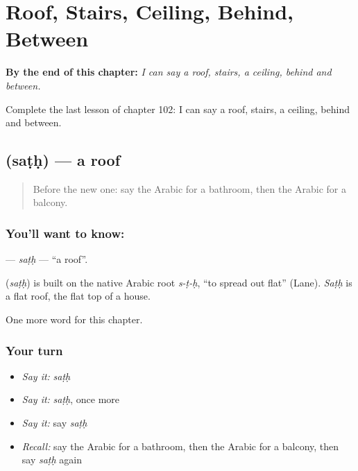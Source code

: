 
\chapter{Roof, Stairs, Ceiling, Behind, Between}
\label{ch:ar-roof-stairs-ceiling-behind-between}

\begin{chapteropening}
\textbf{By the end of this chapter:} \emph{I can say a roof, stairs, a ceiling, behind and between.}

Complete the last lesson of chapter 102: I can say a roof, stairs, a ceiling, behind and between.
\end{chapteropening}

\section[\texorpdfstring{\ar{سطح} (saṭḥ)}{سطح (saṭḥ)}]{ (saṭḥ) — a roof}

\label{lesson:AR-C102-sath}



\begin{quote}
Before the new one: say the Arabic for a bathroom, then the Arabic for a balcony.
\end{quote}

\subsection*{You'll want to know: }
\textbf{} — \emph{saṭḥ} — \textquotedblleft{}a roof\textquotedblright{}.

\begin{cousinweb}
\textbf{} (\emph{saṭḥ}) is built on the native Arabic root \emph{s-ṭ-ḥ}, \textquotedblleft{}to spread out flat\textquotedblright{} (Lane). \emph{Saṭḥ} is a flat roof, the flat top of a house.
\end{cousinweb}

\begin{grammarlens}[title={What you've built}]
One more word for this chapter.
\end{grammarlens}

\subsection*{Your turn}
\begin{itemize}
\raggedright
  \item \emph{Say it:} \emph{saṭḥ}
  \item \emph{Say it:} \emph{saṭḥ}, once more
  \item \emph{Say it:} say \emph{saṭḥ}
  \item \emph{Recall:} say the Arabic for a bathroom, then the Arabic for a balcony, then say \emph{saṭḥ} again
\end{itemize}

